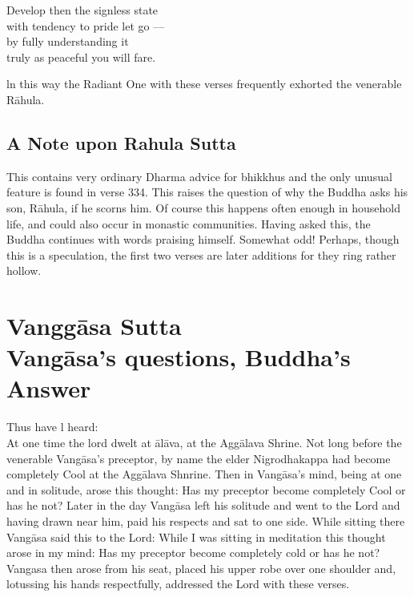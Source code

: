 \begin{MyDescription}{}
Develop then the signless state\\
with tendency to pride let go —\\
by fully understanding it\\
truly as peaceful you will fare.
\end{MyDescription}

ln this way the Radiant One with these verses frequently exhorted the venerable R\=ahula.

\begin{MyDescription}[Sn.335-342]{}
\end{MyDescription}
\newpage

\section{A Note upon Rahula Sutta}
This contains very ordinary Dharma advice for bhikkhus and the only unusual feature is found in verse 334. This raises the question of why the Buddha asks his son, R\=ahula, if he scorns him. Of course this happens often enough in household life, and could also occur in monastic communities. Having asked this, the Buddha continues with words praising himself. Somewhat odd! Perhaps, though this is a speculation, the first two verses are later additions for they ring rather hollow.

\chapter{Vangg\=asa Sutta\\ Vang\=asa's questions, Buddha's Answer}

Thus have l heard:\\
\newline
At one time the lord dwelt at \=al\=ava, at the Agg\=alava Shrine. Not long before the venerable Vang\=asa's preceptor, by name the elder Nigrodhakappa had become completely Cool at the Agg\=alava Shnrine. Then in Vang\=asa's mind, being at one and in solitude, arose this thought: Has my preceptor become completely Cool or has he not? Later in the day Vang\=asa left his solitude and went to the Lord and having drawn near him, paid his respects and sat to one side. While sitting there Vang\=asa said this to the Lord: While I was sitting in meditation this thought arose in my mind: Has my preceptor become completely cold or has he not? Vangasa then arose from his seat, placed his upper robe over one shoulder and, lotussing his hands respectfully, addressed the Lord with these verses.

